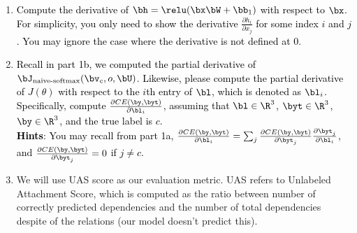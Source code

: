 \begin{parts}
    \begin{enumerate}[label=\roman*.]
    
        \item \textcolor{black}{Compute the derivative of $\bh = \relu(\bx \bW + \bb_1)$ with respect to $\bx$. For simplicity, you only need to show the derivative $\frac{\partial h_i}{\partial x_j}$ for some index $i$ and $j$. You may ignore the case where the derivative is not defined at 0.}

        \item \textcolor{black}{Recall in part 1b, we computed the partial derivative of $\bJ_{\text{naive-softmax}}(\bv_c, o, \bU)$. Likewise, please compute the partial derivative of $J(\theta)$ with respect to the $i$th entry of $\bl$, which is denoted as $\bl_i$. Specifically, compute $\frac{\partial CE(\by, \byt)}{\partial \bl_i}$, assuming that $\bl \in \R^3$, $\byt \in \R^3$, $\by \in \R^3$, and the true label is $c$. \\
        \textbf{Hints}: You may recall from part 1a, $\frac{\partial CE(\by, \byt)}{\partial \bl_i} = \sum_j \frac{\partial CE(\by, \byt)}{\partial \byt_j}\frac{\partial \byt_j}{\partial \bl_i}$, and $\frac{\partial CE(\by, \byt)}{\partial \byt_j}=0$ if $j \neq c$. 
        }

        \item We will use UAS score as our evaluation metric. UAS refers to Unlabeled Attachment Score, which is computed as the ratio between number of correctly predicted dependencies and the number of total dependencies despite of the relations (our model doesn't predict this).\newline
    

\end{enumerate}
\end{parts}
